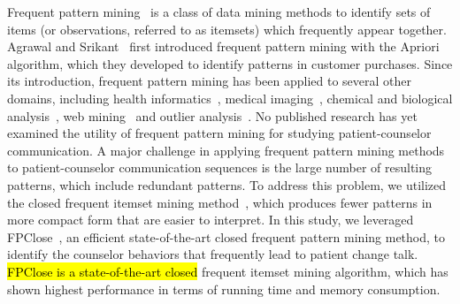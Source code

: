 \documentclass[smallextended]{svjour3}       %
\begin{document}
Frequent pattern mining~\cite{aggarwal2014frequent} is a class of data mining methods to identify sets of items (or observations, referred to as itemsets) which frequently appear together. Agrawal and Srikant~\cite{agrawal1994fast} first introduced frequent pattern mining with the Apriori algorithm, which they developed to identify patterns in customer purchases. Since its introduction, frequent pattern mining has been applied to several other domains, including health informatics~\cite{abdullah2008analysis, olukunle2002fast, bethel2006mining, wright2015use}, medical imaging~\cite{olukunle2002fast}, chemical and biological analysis~\cite{deshpande2005frequent, leach2007introduction, zhang2008discovering}, web mining~\cite{srivastava2000web} and outlier analysis~\cite{aggarwal2015outlier}. No published research has yet examined the utility of frequent pattern mining for studying patient-counselor communication. A major challenge in applying frequent pattern mining methods to patient-counselor communication sequences is the large number of resulting patterns, which include redundant patterns. To address this problem, we utilized the closed frequent itemset mining method~\cite{pasquier1999discovering}, which produces fewer patterns in more compact form that are easier to interpret. In this study, we leveraged FPClose~\cite{grahne2005fast}, an efficient state-of-the-art closed frequent pattern mining method, to identify the counselor behaviors that frequently lead to patient change talk. \hl{FPClose is a state-of-the-art closed} frequent itemset mining algorithm, which has shown highest performance in terms of running time and memory consumption.
\end{document}
